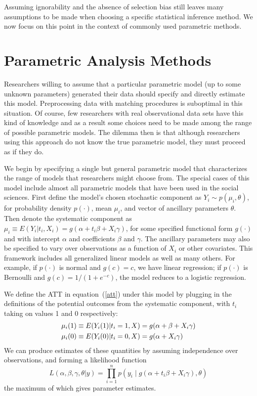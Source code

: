 \documentclass[11pt,titlepage]{article}
\begin{document}
Assuming ignorability and the absence of selection bias still leaves
many assumptions to be made when choosing a specific statistical
inference method.  We now focus on this point in the context of
commonly used parametric methods.

\section{Parametric Analysis Methods}

Researchers willing to assume that a particular parametric model (up
to some unknown parameters) generated their data should specify and
directly estimate this model.  Preprocessing data with matching
procedures is suboptimal in this situation.  Of course, few
researchers with real observational data sets have this kind of
knowledge and as a result some choices need to be made among the range
of possible parametric models. The dilemma then is that although
researchers using this approach do not know the true parametric model,
they must proceed as if they do.

We begin by specifying a single but general parametric model that
characterizes the range of models that researchers might choose from.
The special cases of this model include almost all parametric models
that have been used in the social sciences.  First define the model's
chosen stochastic component as $Y_i \sim p(\mu_i,\theta)$, for
probability density $p(\cdot)$, mean $\mu_i$, and vector of ancillary
parameters $\theta$.  Then denote the systematic component as
$\mu_i\equiv E(Y_i|t_i,X_i)=g(\alpha + t_i\beta + X_i\gamma)$, for
some specified functional form $g(\cdot)$ and with intercept $\alpha$
and coefficients $\beta$ and $\gamma$.  The ancillary parameters may
also be specified to vary over observations as a function of $X_i$ or
other covariates.  This framework includes all generalized linear
models \citep{McCNel89} as well as many others.  For example, if
$p(\cdot)$ is normal and $g(c)=c$, we have linear regression; if
$p(\cdot)$ is Bernoulli and $g(c)=1/(1+e^{-c})$, the model reduces to
a logistic regression.

We define the ATT in equation~(\ref{att}) under this model by plugging
in the definitions of the potential outcomes from the systematic
component, with $t_i$ taking on values 1 and 0 respectively:
\begin{align}
  \label{matt}
\mu_i(1)&\equiv E(Y_i(1)|t_i=1,X)= g(\alpha + \beta + X_i\gamma)\notag \\
\mu_i(0)&\equiv E(Y_i(0)|t_i=0,X) = g(\alpha + X_i\gamma)
\end{align}
We can produce estimates of these quantities by assuming independence
over observations, and forming a likelihood function
\begin{equation}
  \label{lik}
  L(\alpha,\beta,\gamma,\theta|y) = \prod_{i=1}^n 
  p\left(y_i \mid g(\alpha + t_i\beta + X_i\gamma), \theta\right)
\end{equation}
the maximum of which gives parameter estimates.
\end{document}
